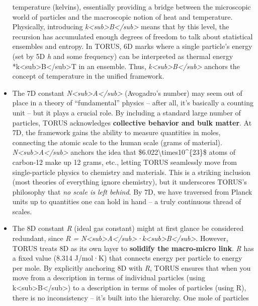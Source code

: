 \begin{itemize}
  temperature (kelvins), essentially providing a bridge between the
  microscopic world of particles and the macroscopic notion of heat and
  temperature. Physically, introducing
  \emph{k\textless{}sub\textgreater{}B\textless{}/sub\textgreater{}}
  means that by this level, the recursion has accumulated enough degrees
  of freedom to talk about statistical ensembles and entropy. In TORUS,
  6D marks where a single particle's energy (set by 5D \emph{h} and some
  frequency) can be interpreted as thermal energy
  *k\textless{}sub\textgreater{}B\textless{}/sub\textgreater{}T in an
  ensemble. Thus,
  \emph{k\textless{}sub\textgreater{}B\textless{}/sub\textgreater{}}
  anchors the concept of temperature in the unified framework.
\item
  The 7D constant
  \emph{N\textless{}sub\textgreater{}A\textless{}/sub\textgreater{}}
  (Avogadro's number) may seem out of place in a theory of
  ``fundamental'' physics -- after all, it's basically a counting unit
  -- but it plays a crucial role. By including a standard large number
  of particles, TORUS acknowledges \textbf{collective behavior and bulk
  matter}. At 7D, the framework gains the ability to measure quantities
  in moles, connecting the atomic scale to the human scale (grams of
  material).
  \emph{N\textless{}sub\textgreater{}A\textless{}/sub\textgreater{}}
  anchors the idea that \$6.022\textbackslash{}times10\^{}\{23\}\$ atoms
  of carbon-12 make up 12 grams, etc., letting TORUS seamlessly move
  from single-particle physics to chemistry and materials. This is a
  striking inclusion (most theories of everything ignore chemistry), but
  it underscores TORUS's philosophy that \emph{no scale is left behind}.
  By 7D, we have traversed from Planck units up to quantities one can
  hold in hand -- a truly continuous thread of scales​.
\item
  The 8D constant \emph{R} (ideal gas constant) might at first glance be
  considered redundant, since \emph{R =
  N\textless{}sub\textgreater{}A\textless{}/sub\textgreater{}·k\textless{}sub\textgreater{}B\textless{}/sub\textgreater{}}.
  However, TORUS treats 8D as its own layer to \textbf{solidify the
  macro-micro link}. \emph{R} has a fixed value (8.314 J/mol·K) that
  connects energy per particle to energy per mole. By explicitly
  anchoring 8D with \emph{R}, TORUS ensures that when you move from a
  description in terms of individual particles (using
  k\textless{}sub\textgreater{}B\textless{}/sub\textgreater{}) to a
  description in terms of moles of particles (using R), there is no
  inconsistency -- it's built into the hierarchy. One mole of particles

\end{itemize}

